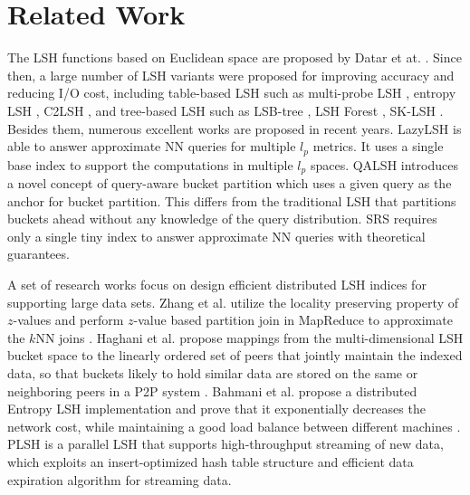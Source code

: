 \section{Related Work}
\label{sec:related}

 The LSH functions based on Euclidean space are proposed by Datar et at. \cite{datar}. Since then, a large number of LSH variants were proposed for improving accuracy and reducing I/O cost, including table-based LSH such as multi-probe LSH \cite{mplsh}, entropy LSH \cite{Panigrahy:2006:EBN:1109557.1109688}, C2LSH \cite{c2lsh}, and tree-based LSH such as LSB-tree \cite{lsb}, LSH Forest \cite{Bawa:2005:LFS:1060745.1060840}, SK-LSH \cite{sklsh}. Besides them, numerous excellent works are proposed in recent years. LazyLSH \cite{Zheng:2016:LAN:2882903.2882930} is able to answer approximate NN queries for multiple $l_p$ metrics. It uses a single base index to support the computations in multiple $l_p$ spaces. QALSH \cite{Huang:2015:QLH:2850469.2850470} introduces a novel concept of query-aware bucket partition which uses a given query as the anchor for bucket partition. This differs from the traditional LSH that partitions buckets ahead without any knowledge of the query distribution. SRS \cite{srs} requires only a single tiny index to answer approximate NN queries with theoretical guarantees.


 A set of research works focus on design efficient distributed LSH indices for supporting large data sets. Zhang et al. utilize the locality preserving property of $z$-values and perform $z$-value based partition join in MapReduce to approximate the $k$NN joins \cite{Zhang:2012:EPK:2247596.2247602}. Haghani et al. propose mappings from the multi-dimensional LSH bucket space to the linearly ordered set of peers that jointly maintain the indexed data, so that buckets likely to hold similar data are stored on the same or neighboring peers in a P2P system \cite{Haghani:2009:DSS:1516360.1516446}. Bahmani et al. propose a distributed Entropy LSH implementation and prove that it exponentially decreases the network cost, while maintaining a good load balance between different machines \cite{distlsh}. PLSH \cite{Sundaram:2013:SSS:2556549.2556574} is a parallel LSH that supports high-throughput streaming of new data, which exploits an insert-optimized hash table structure and efficient data expiration algorithm for streaming data.

